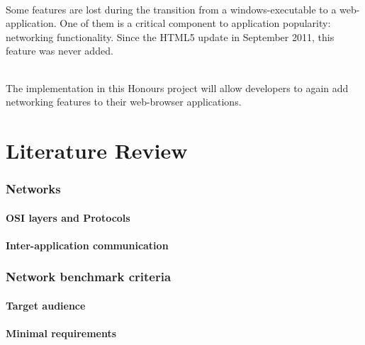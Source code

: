\documentclass[12pt]{article}
\begin{document}
\paragraph{}Some features are lost during the transition from a windows-executable to a web-application. One of them is a critical component to application popularity: networking functionality. Since the HTML5 update in September 2011, this feature was never added.
\paragraph{} The implementation in this Honours project will allow developers to again add networking features to their web-browser applications.

\pagebreak
\part{Literature Review}
\pagebreak

\section{Networks}
\subsection{OSI layers and Protocols}
\subsection{Inter-application communication}

\section{Network benchmark criteria}
\subsection{Target audience}

\subsection{Minimal requirements}
\end{document}
